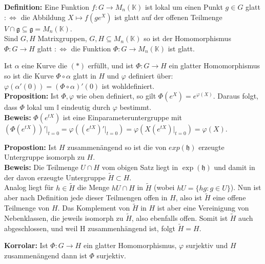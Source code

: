 \documentclass[11pt]{beamer}
\begin{document}
\begin{frame}
		\textbf{Definition:}
		Eine Funktion $f: G\to M_n(\mathbb{K})$ ist lokal um einen Punkt $g \in G$ glatt $:\Leftrightarrow$ die Abbildung $X \mapsto f(ge^X)$ ist glatt auf der offenen Teilmenge $V \cap \mathfrak g \subseteq \mathfrak g = M_n(\mathbb{K})$. \\[1em] \pause
		Sind $G, H$ Matrixgruppen, $G,H \subseteq M_n(\mathbb{K})$ so ist der Homomorphismus $\Phi:G \to H$ glatt $:\Leftrightarrow$ die Funktion $\Phi:G \to M_n(\mathbb{K})$ ist glatt.
\end{frame}

\begin{frame}
	Ist $\alpha$ eine Kurve die $(*)$ erfüllt, und ist $\Phi:G \to H$ ein glatter Homomorphismus so ist die Kurve $\Phi\circ\alpha$ glatt in $H$ und $\varphi$ definiert über:  $\varphi(\alpha'(0)) = (\Phi\circ\alpha)'(0)$ ist wohldefiniert. \\[1em] \pause
	\textbf{Proposition:}
	Ist $\Phi, \varphi$ wie oben definiert, so gilt $\Phi(e^X) = e^{\varphi(X)}$.
	Daraus folgt, dass $\Phi$ lokal um $\mathbb{I}$ eindeutig durch $\varphi$ bestimmt. \\[1em] \pause
	\textbf{Beweis:}
	$\Phi(e^{tX})$ ist eine Einparameteruntergruppe mit $(\Phi(e^{tX}))'\big\vert_{t=0} = \varphi((e^{tX})'\big\vert_{t=0}) = \varphi(X(e^{tX})\big\vert_{t=0}) = \varphi(X)$.	
\end{frame}


\begin{frame}
	\textbf{Propostion:}
	Ist $H$ zusammenängend so ist die von $exp(\mathfrak{h})$ erzeugte Untergruppe isomorph zu $H$.\\ [1em] \pause 
	\textbf{Beweis:}
	Die Teilmenge $U\cap H$ vom obigen Satz liegt in $\exp(\mathfrak h)$ und damit in der davon erzeugte Untergruppe $\tilde H\subset H$. \\ \pause
	Analog liegt für $h\in\tilde H$ die Menge $hU\cap H$ in $\tilde H$ (wobei $hU = \{hg:g\in U\}$).
	Nun ist aber nach Definition jede dieser Teilmengen offen in $H$,\pause
	 also ist $\tilde H$ eine offene Teilmenge von $H$. 
	Das Komplement von $\tilde H$ in $H$ ist aber eine Vereinigung von Nebenklassen, die jeweils
	isomorph zu $\tilde H$, also ebenfalls offen. \pause
	Somit ist $\tilde H$ auch abgeschlossen, und weil H
	zusammenhängend ist, folgt $\tilde H=H$. \\[1em] \pause
	
	\textbf{Korrolar:}
	Ist $\Phi:G \rightarrow H$ ein glatter Homomorphismus, $\varphi$ surjektiv
	und $H$ zusammenängend dann ist $\Phi$ surjektiv. \\[1em]
\end{frame}
\end{document}
